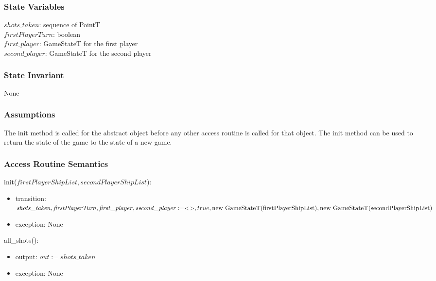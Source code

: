 \documentclass[12pt]{article}
\begin{document}
\subsubsection* {State Variables}

\noindent $shots\_taken$: sequence of PointT\\
$\mathit{firstPlayerTurn}$: boolean \\
$first\_player$: GameStateT for the first player \\
$second\_player$: GameStateT for the second player \\

\subsubsection* {State Invariant}

None

\subsubsection* {Assumptions}

The init method is called for the abstract object before any other access routine is called for that
object.  The init method can be used to return the state of the game to the state of a new game.

\subsubsection* {Access Routine Semantics}

\noindent init($\mathit{firstPlayerShipList}, \mathit{secondPlayerShipList}$):
\begin{itemize}
\item transition: 
$\mathit{shots\_taken}, \mathit{firstPlayerTurn}, \mathit{first\_player}, \mathit{second\_player} := <>,  true,\\
 \mbox{new GameStateT(firstPlayerShipList)}, \mbox{new GameStateT(secondPlayerShipList)} $
\item exception: None
\end{itemize}


\noindent all\_shots():
\begin{itemize}
\item output: $out := shots\_taken$
\item exception: None
\end{itemize}
\end{document}
